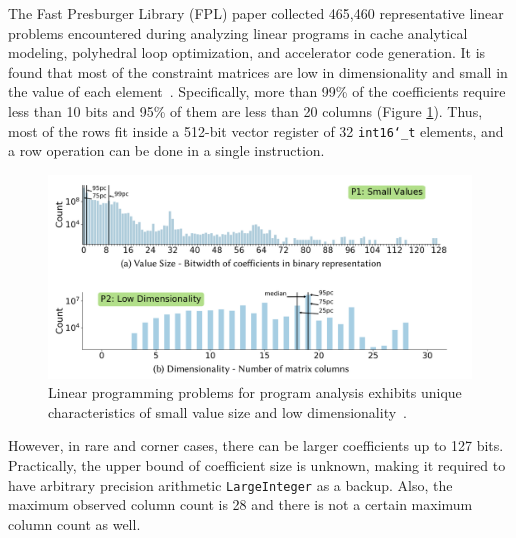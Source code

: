 \documentclass[logo,bsc,singlespacing,parskip]{infthesis}
\newcommand{\dtshort}{\texttt{int16\char`_t}}
\begin{document}
The Fast Presburger Library (FPL) paper collected 465,460 representative linear
problems encountered during analyzing linear programs in cache analytical
modeling, polyhedral loop optimization, and accelerator code generation. It is
found that most of the constraint matrices are low in dimensionality and small
in the value of each element~\cite{FPL1}. Specifically, more than 99\% of the
coefficients require less than 10 bits and 95\% of them are less than 20 columns
(Figure \ref{small-val-low-dim}). Thus, most of the rows fit inside a 512-bit
vector register of 32 \dtshort{} elements, and a row operation can be done in a
single instruction. 


\begin{figure}
    \begin{center}
    \includegraphics[width=\linewidth]{image/small-val-low-dim.png}
    \caption{Linear programming problems for program analysis exhibits unique
    characteristics of small value size and low dimensionality~\cite{FPL1}.}
    \label{small-val-low-dim}
    \end{center}
\end{figure}


However, in rare and corner cases, there can be larger coefficients up to 127
bits. Practically, the upper bound of coefficient size is unknown, making it
required to have arbitrary precision arithmetic \texttt{LargeInteger} as a
backup. Also, the maximum observed column count is 28 and there is not a certain
maximum column count as well. 
\end{document}
